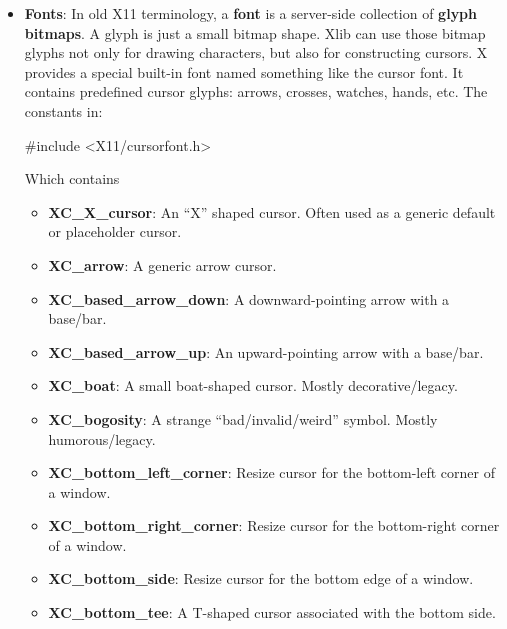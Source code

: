 \documentclass{report}
\begin{document}
\begin{itemize}
            \bigbreak \noindent 
            The \textbf{hotspot} is the coordinate inside the cursor image that counts as the actual pointer location.
            \bigbreak \noindent 
            For example, with an arrow cursor, the visible image may be 16 by 16 pixels, but the actual click point is usually the arrow tip:
        \item \textbf{Fonts}: In old X11 terminology, a \textbf{font} is a server-side collection of \textbf{glyph bitmaps}. A glyph is just a small bitmap shape. Xlib can use those bitmap glyphs not only for drawing characters, but also for constructing cursors.
                \bigbreak \noindent 
                X provides a special built-in font named something like the cursor font. It contains predefined cursor glyphs: arrows, crosses, watches, hands, etc. The constants in:
                \bigbreak \noindent 
                \begin{cppcode}
                #include <X11/cursorfont.h>
                \end{cppcode}
                \bigbreak \noindent 
                Which contains
                \begin{itemize}
                    \item \textbf{XC\_X\_cursor}:	An “X” shaped cursor. Often used as a generic default or placeholder cursor.
                    \item \textbf{XC\_arrow}:	A generic arrow cursor.
                    \item \textbf{XC\_based\_arrow\_down}:	A downward-pointing arrow with a base/bar.
                    \item \textbf{XC\_based\_arrow\_up}:	An upward-pointing arrow with a base/bar.
                    \item \textbf{XC\_boat}:	A small boat-shaped cursor. Mostly decorative/legacy.
                    \item \textbf{XC\_bogosity}:	A strange “bad/invalid/weird” symbol. Mostly humorous/legacy.
                    \item \textbf{XC\_bottom\_left\_corner}:	Resize cursor for the bottom-left corner of a window.
                    \item \textbf{XC\_bottom\_right\_corner}:	Resize cursor for the bottom-right corner of a window.
                    \item \textbf{XC\_bottom\_side}:	Resize cursor for the bottom edge of a window.
                    \item \textbf{XC\_bottom\_tee}:	A T-shaped cursor associated with the bottom side.

\end{itemize}
\end{itemize}
\end{document}

